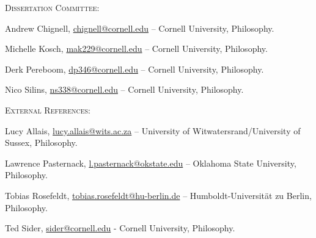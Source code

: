 \documentclass[11pt]{article}
\begin{document}

  






{}
\medskip

\ind \textsc{Dissertation Committee:}
\medskip

\ind Andrew Chignell, \href{mailto:chignell@cornell.edu}{chignell@cornell.edu} – Cornell University, Philosophy.
 
\ind Michelle Kosch, \href{mailto:mak229@cornell.edu}{mak229@cornell.edu} – Cornell University, Philosophy.
 
\ind Derk Pereboom, \href{mailto:dp346@cornell.edu}{dp346@cornell.edu} – Cornell University, Philosophy.

\ind Nico Silins, \href{mailto:ns338@cornell.edu}{ns338@cornell.edu} – Cornell University, Philosophy.

\medskip

\ind \textsc{External References:}
\medskip

\noindent Lucy Allais, \href{mailto:lucy.allais@wits.ac.za}{lucy.allais@wits.ac.za} – University of Witwatersrand/University of Sussex, Philosophy.

\noindent Lawrence Pasternack, \href{mailto:l.pasternack@okstate.edu}{l.pasternack@okstate.edu} – Oklahoma State University, Philosophy. 

\noindent Tobias Rosefeldt, \href{mailto:tobias.rosefeldt@hu-berlin.de}{tobias.rosefeldt@hu-berlin.de} – Humboldt-Universität zu Berlin, Philosophy.

\noindent Ted Sider, \href{mailto:sider@cornell.edu}{sider@cornell.edu} - Cornell University, Philosophy.
\end{document}
